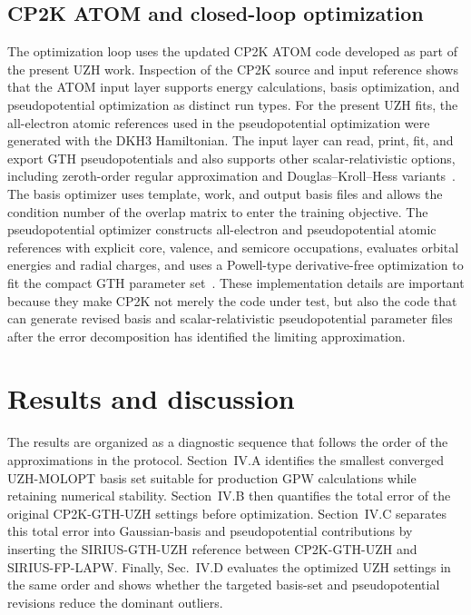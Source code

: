 \documentclass[aps,prb,reprint,amsmath,amssymb,superscriptaddress,longbibliography,floatfix]{revtex4-2}
\begin{document}
\subsection{CP2K ATOM and closed-loop optimization}

The optimization loop uses the updated CP2K ATOM code developed as part of the present UZH work. Inspection of the CP2K source and input reference shows that the ATOM input layer supports energy calculations, basis optimization, and pseudopotential optimization as distinct run types. For the present UZH fits, the all-electron atomic references used in the pseudopotential optimization were generated with the DKH3 Hamiltonian. The input layer can read, print, fit, and export GTH pseudopotentials and also supports other scalar-relativistic options, including zeroth-order regular approximation and Douglas--Kroll--Hess variants~\cite{CP2K2020,CP2KMadeSimple2026}. The basis optimizer uses template, work, and output basis files and allows the condition number of the overlap matrix to enter the training objective. The pseudopotential optimizer constructs all-electron and pseudopotential atomic references with explicit core, valence, and semicore occupations, evaluates orbital energies and radial charges, and uses a Powell-type derivative-free optimization to fit the compact GTH parameter set~\cite{Powell1964}. These implementation details are important because they make CP2K not merely the code under test, but also the code that can generate revised basis and scalar-relativistic pseudopotential parameter files after the error decomposition has identified the limiting approximation.

\section{Results and discussion}

The results are organized as a diagnostic sequence that follows the order of the approximations in the protocol. Section~IV.A identifies the smallest converged UZH-MOLOPT basis set suitable for production GPW calculations while retaining numerical stability. Section~IV.B then quantifies the total error of the original CP2K-GTH-UZH settings before optimization. Section~IV.C separates this total error into Gaussian-basis and pseudopotential contributions by inserting the SIRIUS-GTH-UZH reference between CP2K-GTH-UZH and SIRIUS-FP-LAPW. Finally, Sec.~IV.D evaluates the optimized UZH settings in the same order and shows whether the targeted basis-set and pseudopotential revisions reduce the dominant outliers.
\end{document}
